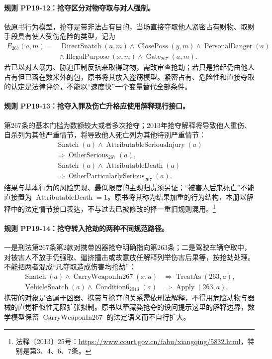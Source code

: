 \paragraph{规则 PP19-12：抢夺区分对物夺取与对人强制。}
\mbox{}\par
依原书行为模型，抢夺是带非法占有目的，当场直接夺取他人紧密占有财物、取财手段具有使人受伤危险的类型，记为
\[
\begin{aligned}
E_{267}(a,m)={}&\operatorname{DirectSnatch}(a,m)
\land\operatorname{ClosePoss}(y,m)
\land\operatorname{PersonalDanger}(a)\\
&\land\operatorname{IllegalPurpose}(x,m)
\land\operatorname{Gate}_{267}(a,m).
\end{aligned}
\]
若已以对人暴力、胁迫压制反抗来取得财物，需改审查抢劫；若只是拾起仍由他人占有但已落在数米外的包，原书将其放入盗窃模型。紧密占有、危险性和直接夺取的认定是法律评价，不能以“速度快”一个变量替代全部条件。

\paragraph{规则 PP19-13：抢夺入罪及伤亡升格应使用解释现行接口。}
\mbox{}\par
第267条的基本门槛为数额较大或者多次抢夺；2013年抢夺解释将导致他人重伤、自杀列为其他严重情节，将导致他人死亡列为其他特别严重情节：
\[
\begin{gathered}
\operatorname{Snatch}(a)\land\operatorname{AttributableSeriousInjury}(a)\\
\Rightarrow\operatorname{OtherSerious}_{267}(a),\\
\operatorname{Snatch}(a)\land\operatorname{AttributableDeath}(a)\\
\Rightarrow\operatorname{OtherParticularlySerious}_{267}(a).
\end{gathered}
\]
结果与基本行为的风险实现、最低限度的主观归责须另证；“被害人后来死亡”不能直接置为 $\operatorname{AttributableDeath}=1$。原书将其称为结果加重的行为结构，本册以解释中的法定情节接口表达，不与过去已被修改的择一重旧规则混用。\footnote{法释〔2013〕25号：\url{https://www.court.gov.cn/fabu/xiangqing/5832.html}，特别是第3、4、6、7条。}

\paragraph{规则 PP19-14：抢夺转入抢劫的两种不同规范路径。}
\mbox{}\par
一是刑法第267条第2款对携带凶器抢夺明确指向第263条；二是驾驶车辆夺取中，对被害人不放手仍强取、逼挤撞击或故意放任解释列举伤害后果等，按抢劫处理。不能把两者混成“凡夺取造成伤害均抢劫”：
\[
\begin{aligned}
\operatorname{Snatch}(a)\land\operatorname{CarryWeaponIn267}(x,a)
&\Rightarrow\operatorname{TreatAs}(263,a),\\
\operatorname{VehicleSnatch}(a)\land\operatorname{Condition6}_{2013}(a)
&\Rightarrow\operatorname{Apply}(263,a).
\end{aligned}
\]
携带的对象是否属于凶器、携带与抢夺的关系需依刑法解释，不得用危险动物与器械的直觉相似性无限扩张拟制。原书以牵藏獒抢夺的设问提示这里的解释边界，数学模型保留 $\operatorname{CarryWeaponIn267}$ 的法定语义而不自行扩大。

